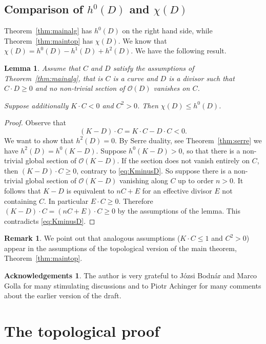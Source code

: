 \documentclass[11pt]{amsart}
\numberwithin{equation}{section}
\theoremstyle{plain}
\newtheorem{lemma}[equation]{Lemma}
\theoremstyle{definition}
\newtheorem{remark}[equation]{Remark}
\newtheorem*{acknowledgements}{Acknowledgements}
\begin{document}
\subsection{Comparison of $h^0(D)$ and $\chi(D)$}
Theorem~\ref{thm:mainalg} has $h^0(D)$ on the right hand side, while Theorem~\ref{thm:maintop} has $\chi(D)$. We know that 
$\chi(D)=h^0(D)-h^1(D)+h^2(D)$. We have the following result.
\begin{lemma}
Assume that $C$ and $D$ satisfy the assumptions of Theorem~\ref{thm:mainalg}, that is $C$ is a curve and $D$ is a divisor
such that $C\cdot D\ge 0$ and no non-trivial section of $\mathcal{O}(D)$ vanishes on $C$.

Suppose additionally $K\cdot C<0$ and $C^2>0$. Then $\chi(D)\le h^0(D)$.
\end{lemma}
\begin{proof}
Observe that
\begin{equation}\label{eq:KminusD}
(K-D)\cdot C=K\cdot C-D\cdot C<0.
\end{equation}
We want to show that $h^2(D)=0$. By Serre duality, see Theorem~\ref{thm:serre} 
we have $h^2(D)=h^0(K-D)$. Suppose $h^0(K-D)>0$, so that there is a non-trivial global section
of $\mathcal{O}(K-D)$. If the section does not vanish entirely on $C$, then $(K-D)\cdot C\ge 0$, contrary to \eqref{eq:KminusD}.
So suppose there is a non-trivial global section of $\mathcal{O}(K-D)$ vanishing along $C$ up to order $n>0$. 
It follows that $K-D$ is equivalent to $nC+E$ for an effective divisor $E$ not containing $C$. In particular $E\cdot C\ge 0$.
Therefore $(K-D)\cdot C=(nC+E)\cdot C\ge 0$ by the assumptions of the lemma. This contradicts \eqref{eq:KminusD}.
\end{proof}

\begin{remark}
We point out that analogous assumptions ($K\cdot C\le 1$ and $C^2>0$) appear in the assumptions of the topological version of the main theorem,
Theorem~\ref{thm:maintop}.
\end{remark}

\begin{acknowledgements}
The author is very grateful to J\'ozsi Bodn\'ar and Marco Golla for many stimulating discussions and to Piotr Achinger for many comments about
the earlier version of the draft.
\end{acknowledgements}

\section{The topological proof}
\end{document}

